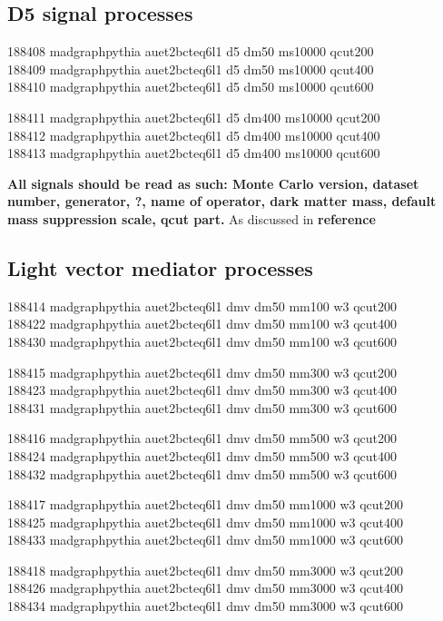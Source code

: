 \subsection{D5 signal processes}
188408 madgraphpythia  auet2bcteq6l1  d5  dm50  ms10000  qcut200\\
188409 madgraphpythia  auet2bcteq6l1  d5  dm50  ms10000  qcut400\\
188410 madgraphpythia  auet2bcteq6l1  d5  dm50  ms10000  qcut600

188411 madgraphpythia  auet2bcteq6l1  d5  dm400  ms10000  qcut200\\
188412 madgraphpythia  auet2bcteq6l1  d5  dm400  ms10000  qcut400\\
188413 madgraphpythia  auet2bcteq6l1  d5  dm400  ms10000  qcut600

\textbf{All signals should be read as such: Monte Carlo version, dataset number, generator, ?, name of operator,  dark matter mass, default mass suppression scale, qcut part.} As discussed in \textbf{reference} 
\subsection{Light vector mediator processes}\label{livecmedpro}
188414 madgraphpythia auet2bcteq6l1 dmv dm50 mm100 w3 qcut200\\ 188422 madgraphpythia auet2bcteq6l1 dmv dm50 mm100 w3 qcut400\\
188430 madgraphpythia auet2bcteq6l1 dmv dm50 mm100 w3 qcut600
 
188415 madgraphpythia auet2bcteq6l1 dmv dm50 mm300 w3 qcut200\\
188423 madgraphpythia auet2bcteq6l1 dmv dm50 mm300 w3 qcut400\\
188431 madgraphpythia auet2bcteq6l1 dmv dm50 mm300 w3 qcut600

188416 madgraphpythia auet2bcteq6l1 dmv dm50 mm500 w3 qcut200\\
188424 madgraphpythia auet2bcteq6l1 dmv dm50 mm500 w3 qcut400\\
188432 madgraphpythia auet2bcteq6l1 dmv dm50 mm500 w3 qcut600

188417 madgraphpythia auet2bcteq6l1 dmv dm50 mm1000 w3 qcut200\\
188425 madgraphpythia auet2bcteq6l1 dmv dm50 mm1000 w3 qcut400\\
188433 madgraphpythia auet2bcteq6l1 dmv dm50 mm1000 w3 qcut600

188418 madgraphpythia auet2bcteq6l1 dmv dm50 mm3000 w3 qcut200\\
188426 madgraphpythia auet2bcteq6l1 dmv dm50 mm3000 w3 qcut400\\
188434 madgraphpythia auet2bcteq6l1 dmv dm50 mm3000 w3 qcut600

